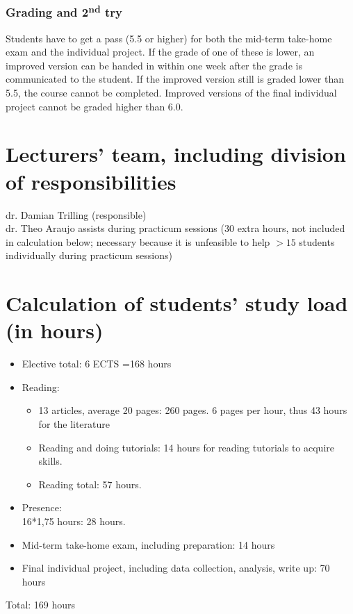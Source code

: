 \documentclass[a4paper,12pt]{report}
\begin{document}
\subsection*{Grading and 2\textsuperscript{nd} try}
Students have to get a pass (5.5 or higher) for both the mid-term take-home exam and the individual project. If the grade of one of these is lower, an improved version can be handed in within one week after the grade is communicated to the student. If the improved version still is graded lower than 5.5, the course cannot be completed. Improved versions of the final individual project cannot be graded higher than 6.0. 


\chapter{Lecturers' team, including division of responsibilities}
dr. Damian Trilling (responsible)\\
dr. Theo Araujo assists during practicum sessions (30 extra hours, not included in calculation below; necessary because it is unfeasible to help $>15$ students individually during practicum sessions)


\chapter{Calculation of students' study load (in hours)}
\begin{itemize}

\item Elective total: 6 ECTS =168 hours
\item Reading: 
\begin{itemize}
\item 13 articles, average 20 pages: 260 pages. 6 pages per hour, thus 43 hours for the literature
\item Reading and doing tutorials: 14 hours for reading tutorials to acquire skills.
\item Reading total: 57 hours.
\end{itemize}
\item Presence: \\16*1,75 hours: 28 hours.
\item Mid-term take-home exam, including preparation: 14 hours
\item Final individual project, including data collection, analysis, write up: 70 hours
\end{itemize}

Total: 169 hours
\end{document}
